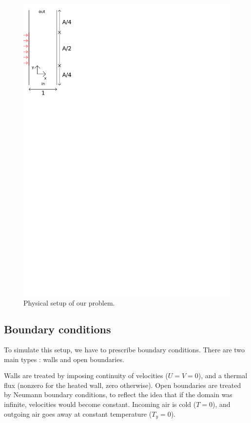 \documentclass[12pt]{article}
\begin{document}
\begin{figure}[h!]
\centering
\includegraphics{figs/schema}
\caption{Physical setup of our problem.}
\label{fig:schema}
\end{figure}

\subsection{Boundary conditions}
To simulate this setup, we have to prescribe boundary
conditions. There are two main types : walls and open boundaries.

Walls are treated by imposing continuity of velocities ($U = V = 0$),
and a thermal flux (nonzero for the heated wall, zero otherwise). Open
boundaries are treated by Neumann boundary conditions, to reflect the
idea that if the domain was infinite, velocities would become
constant. Incoming air is cold ($T = 0$), and outgoing air goes away
at constant temperature ($T_{y} = 0$).
\end{document}
